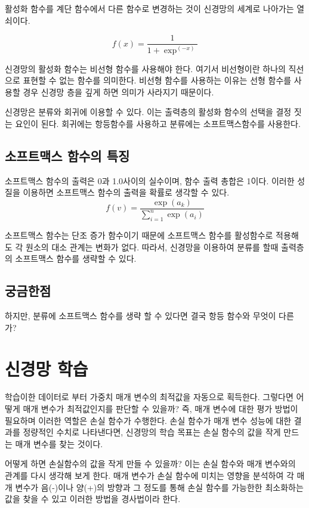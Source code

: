 \documentclass[12pt]{article}
\begin{document}
	활성화 함수를 계단 함수에서 다른 함수로 변경하는 것이 신경망의 세계로 나아가는 열쇠이다.
	
	\[ f(x)=\frac{1}{1+\exp^(-x)}	\]
	
	신경망의 활성화 함수는 비선형 함수를 사용해야 한다. 여기서 비선형이란 하나의 직선으로 표현할 수 없는 함수를 의미한다.
	비선형 함수를 사용하는 이유는 선형 함수를 사용할 경우 신경망 층을 깊게 하면 의미가 사라지기 때문이다.
	
	신경망은 분류와 회귀에 이용할 수 있다. 이는 출력층의 활성화 함수의 선택을 결정 짓는 요인이 된다. 회귀에는 항등함수를 사용하고 분류에는 소프트맥스함수를 사용한다.
	
	\subsection{소프트맥스 함수의 특징}
	소프트맥스 함수의 출력은 0과 1.0사이의 실수이며, 함수 출력 총합은 1이다.
	이러한 성질을 이용하면 소프트맥스 함수의 출력을 확률로 생각할 수 있다.
	\[ f(v) = \frac{\exp(a_{k})} {\sum_{i=1}^{n}  {\exp(a_{i})}} \]
	
	소프트맥스 함수는 단조 증가 함수이기 때문에 소프트맥스 함수를 활성함수로 적용해도 각 원소의 대소 관계는 변화가 없다. 따라서, 신경망을 이용하여 분류를 할때 출력층의 소프트맥스 함수를 생략할 수 있다.
	
	\subsection{궁금한점}
	하지만, 분류에 소프트맥스 함수를 생략 할 수 있다면 결국 항등 함수와 무엇이 다른가?
	\clearpage
	
\section{신경망 학습}
학습이한 데이터로 부터 가중치 매개 변수의 최적값을 자동으로 획득한다.
그렇다면 어떻게 매개 변수가 최적값인지를 판단할 수 있을까?
즉, 매개 변수에 대한 평가 방법이 필요하며 이러한 역할은 손실 함수가 수행한다.
손실 함수가 매개 변수 성능에 대한 결과를 정량적인 수치로 나타낸다면, 
신경망의 학습 목표는 손실 함수의 값을 작게 만드는 매개 변수를 찾는 것이다.

어떻게 하면 손실함수의 값을 작게 만들 수 있을까?
이는 손실 함수와 매개 변수와의 관계를 다시 생각해 보게 한다.
매개 변수가 손실 함수에 미치는 영향을 분석하여 각 매개 변수가 음(-)이나 양(+)의 방향과 그 정도를 통해
손실 함수를 가능한한 최소화하는 값을 찾을 수 있고 이러한 방법을 경사법이라 한다.
\end{document}
